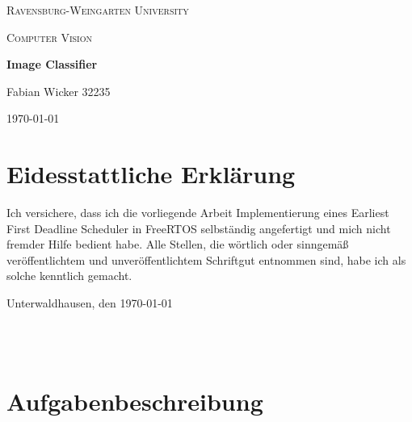 \documentclass{scrartcl}
\begin{document}
	\begin{titlepage}
		\centering
		{\scshape\LARGE Ravensburg-Weingarten University\par}
		\vspace{1.5cm}
		\begin{figure}[hb]
			\centering
			\rwulogo[width=0.4\columnwidth]
		\end{figure}

		\vspace{5cm}
		{\scshape\Large Computer Vision\par}
		\vspace{0.25cm}
		{\huge\bfseries Image Classifier\par}
		\vspace{6cm}
		{\Large Fabian Wicker 32235\par}
		\vfill
		{\large \today\par}
	\end{titlepage}
	\clearpage 
	\section{Eidesstattliche Erklärung}


		Ich versichere, dass ich die vorliegende Arbeit \glqq{}Implementierung eines Earliest First Deadline Scheduler in FreeRTOS\grqq{} selbständig angefertigt und mich nicht fremder Hilfe bedient habe.
		Alle Stellen, die wörtlich oder sinngemäß veröffentlichtem und unveröffentlichtem Schriftgut entnommen sind, habe ich als solche kenntlich gemacht.
		\vspace{1.5cm}

		
		Unterwaldhausen, den \today
		\begin{flushleft}
			\makebox[.4\textwidth]{}\\
			\makebox[.4\textwidth]{\hrulefill}\\
		\end{flushleft}
	\clearpage
	\section{Aufgabenbeschreibung}
		
	\clearpage
	\tableofcontents
	\clearpage
	\listoffigures
	\clearpage
	\listoftables
	\clearpage
	\clearpage
\end{document}
